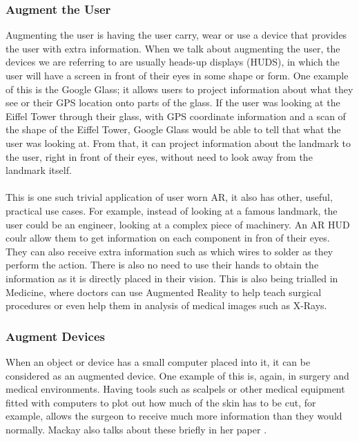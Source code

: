 \documentclass[11pt]{article}
\begin{document}
\subsubsection{Augment the User} 
Augmenting the user is having the user carry, wear or use a device
that provides the user with extra information. When we talk about augmenting
the user, the devices we are referring to are usually
heads-up displays (HUDS), in which the user will have a screen in front of their
eyes in some shape or form. One example of this is the Google Glass; it allows
users to project information about what they see or their GPS location onto
parts of the glass. If the user was looking at the Eiffel Tower through their 
glass, with GPS coordinate information and a scan of the shape of the Eiffel Tower, 
Google Glass would be able to tell that what the user was looking at. From that,
it can project information about the landmark to the user, right in
front of their eyes, without need to look away from the landmark itself.\\
\\
This is one such trivial application of
user worn AR, it also has other, useful, practical use cases. 
For example, instead of 
looking at a famous landmark, the user could be an engineer, looking at a 
complex piece of machinery. An AR HUD coulr allow them to get information 
on each component in fron of their eyes. They can also receive extra
information such as which wires to solder as they perform the action. 
There is also no need to use their hands to obtain the information as it
is directly placed in their vision.
This is also being trialled in Medicine, where doctors can use
Augmented Reality to help teach surgical procedures or even help them in
analysis of medical images such as X-Rays.

\subsubsection{Augment Devices} 
When an object or device has a small computer placed into it, it can be 
considered as an augmented device. One example of this is, again, in 
surgery and medical environments. Having tools such as scalpels or other 
medical equipment fitted with computers to plot out how much of the skin has
to be cut, for example, allows the surgeon to receive much more information
than they would normally. Mackay also talks about these briefly 
in her paper \cite{Mackay}.
\end{document}
